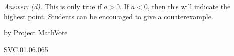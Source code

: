 {\it Answer: (d).}  This is only true if $a > 0$.  If $a < 0$, then this will indicate the highest point.  Students can be encouraged to give a counterexample.

\medskip
by Project MathVote

SVC.01.06.065

